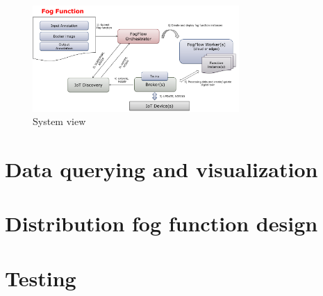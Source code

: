\documentclass[conference]{ieeeconf}
\begin{document}
\begin{figure}[h]
    \centering
    \includegraphics[width=0.7\textwidth]{Images/function-orchestration.png}
    \caption{System view}
\end{figure}{}
\section{Data querying and visualization}


\section{Distribution fog function design}


\section{Testing}

\printbibliography
\end{document}
